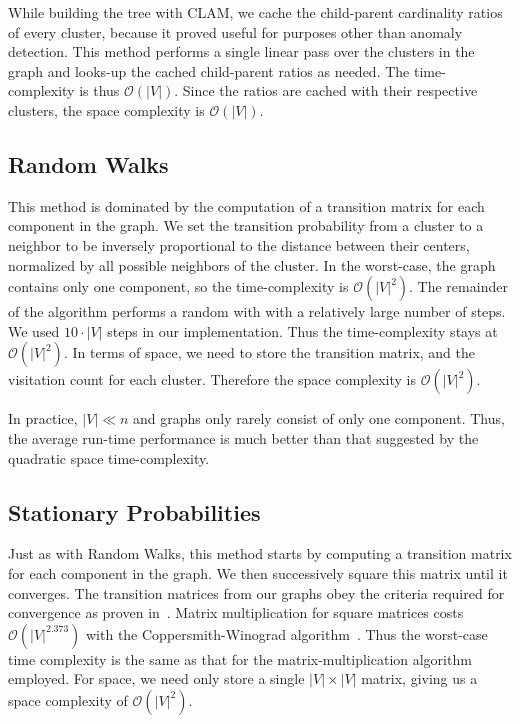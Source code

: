 While building the tree with CLAM, we cache the child-parent cardinality ratios of every cluster, because it proved useful for purposes other than anomaly detection.
This method performs a single linear pass over the clusters in the graph and looks-up the cached child-parent ratios as needed.
The time-complexity is thus $\mathcal{O}(|V|)$.
Since the ratios are cached with their respective clusters, the space complexity is $\mathcal{O}(|V|)$.

\subsection{Random Walks}

This method is dominated by the computation of a transition matrix for each component in the graph.
We set the transition probability from a cluster to a neighbor to be inversely proportional to the distance between their centers, normalized by all possible neighbors of the cluster.
In the worst-case, the graph contains only one component, so the time-complexity is $\mathcal{O}(|V|^2)$.
The remainder of the algorithm performs a random with with a relatively large number of steps.
We used $10 \cdot |V|$ steps in our implementation.
Thus the time-complexity stays at $\mathcal{O}(|V|^2)$.
In terms of space, we need to store the transition matrix, and the visitation count for each cluster.
Therefore the space complexity is $\mathcal{O}(|V|^2)$.

In practice, $|V| \ll n$ and graphs only rarely consist of only one component.
Thus, the average run-time performance is much better than that suggested by the quadratic space time-complexity.

\subsection{Stationary Probabilities}

Just as with Random Walks, this method starts by computing a transition matrix for each component in the graph.
We then successively square this matrix until it converges.
The transition matrices from our graphs obey the criteria required for convergence as proven in~\cite{levin2017markov}.
Matrix multiplication for square matrices costs $\mathcal{O}(|V|^{2.373})$ with the Coppersmith-Winograd algorithm~\cite{coppersmith1987matrix}.
Thus the worst-case time complexity is the same as that for the matrix-multiplication algorithm employed.
For space, we need only store a single $|V| \times |V|$ matrix, giving us a space complexity of $\mathcal{O}(|V|^2)$.

